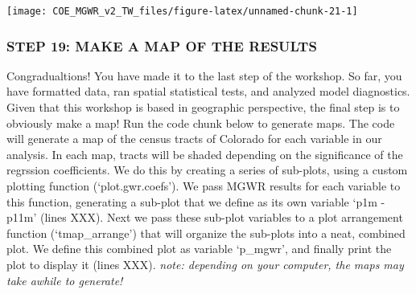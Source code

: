 \documentclass[
  12pt,
]{article}
\begin{document}
\begin{center}\texttt{[image: COE\_MGWR\_v2\_TW\_files/figure-latex/unnamed-chunk-21-1]} \end{center}

\hypertarget{step-19-make-a-map-of-the-results}{%
\subsubsection{STEP 19: MAKE A MAP OF THE
RESULTS}\label{step-19-make-a-map-of-the-results}}

Congradualtions! You have made it to the last step of the workshop. So
far, you have formatted data, ran spatial statistical tests, and
analyzed model diagnostics. Given that this workshop is based in
geographic perspective, the final step is to obviously make a map! Run
the code chunk below to generate maps. The code will generate a map of
the census tracts of Colorado for each variable in our analysis. In each
map, tracts will be shaded depending on the significance of the
regrssion coefficients. We do this by creating a series of sub-plots,
using a custom plotting function (`plot.gwr.coefs'). We pass MGWR
results for each variable to this function, generating a sub-plot that
we define as its own variable `p1m - p11m' (lines XXX). Next we pass
these sub-plot variables to a plot arrangement function
(`tmap\_arrange') that will organize the sub-plots into a neat, combined
plot. We define this combined plot as variable `p\_mgwr', and finally
print the plot to display it (lines XXX). \emph{note: depending on your
computer, the maps may take awhile to generate!}
\end{document}
